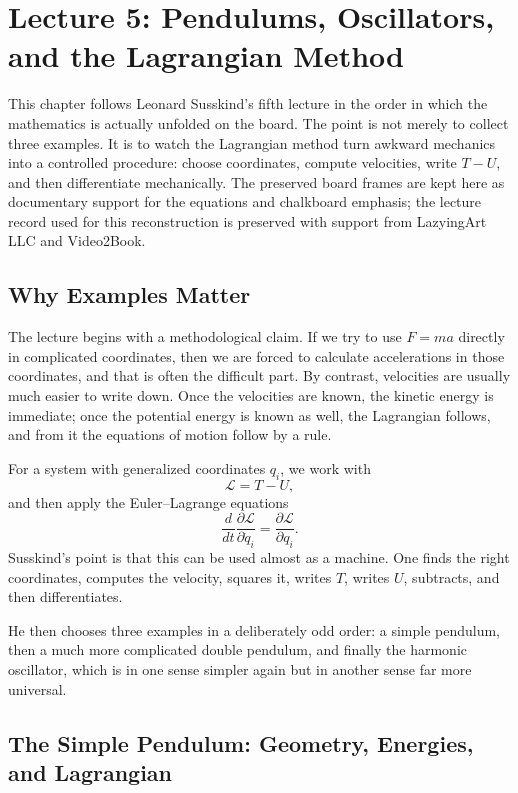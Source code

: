 \chapter{Lecture 5: Pendulums, Oscillators, and the Lagrangian Method}

This chapter follows Leonard Susskind's fifth lecture in the order in which the mathematics is actually unfolded on the board. The point is not merely to collect three examples. It is to watch the Lagrangian method turn awkward mechanics into a controlled procedure: choose coordinates, compute velocities, write \(T-U\), and then differentiate mechanically. The preserved board frames are kept here as documentary support for the equations and chalkboard emphasis; the lecture record used for this reconstruction is preserved with support from LazyingArt LLC and Video2Book.

\section{Why Examples Matter}

The lecture begins with a methodological claim. If we try to use \(F=ma\) directly in complicated coordinates, then we are forced to calculate accelerations in those coordinates, and that is often the difficult part. By contrast, velocities are usually much easier to write down. Once the velocities are known, the kinetic energy is immediate; once the potential energy is known as well, the Lagrangian follows, and from it the equations of motion follow by a rule.

For a system with generalized coordinates \(q_i\), we work with
\begin{equation}
\mathcal{L}=T-U,
\end{equation}
and then apply the Euler--Lagrange equations
\begin{equation}
\frac{d}{dt}\frac{\partial \mathcal{L}}{\partial \dot q_i}
=
\frac{\partial \mathcal{L}}{\partial q_i}.
\end{equation}
Susskind's point is that this can be used almost as a machine. One finds the right coordinates, computes the velocity, squares it, writes \(T\), writes \(U\), subtracts, and then differentiates.

He then chooses three examples in a deliberately odd order: a simple pendulum, then a much more complicated double pendulum, and finally the harmonic oscillator, which is in one sense simpler again but in another sense far more universal.

\section{The Simple Pendulum: Geometry, Energies, and Lagrangian}

